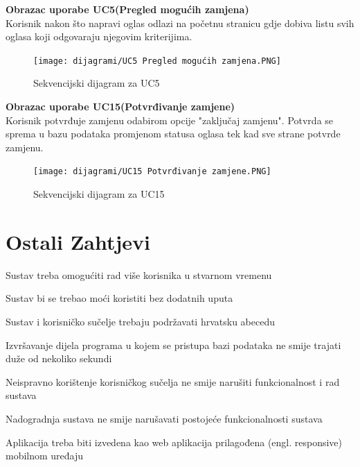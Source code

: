 \noindent \textbf{Obrazac uporabe UC5(Pregled mogućih zamjena)}\\
\indent Korisnik nakon što napravi oglas odlazi na početnu stranicu gdje dobiva listu svih oglasa koji odgovaraju njegovim kriterijima.


\begin{figure}[H]
	\texttt{[image: dijagrami/UC5 Pregled mogućih zamjena.PNG]} %
	\centering
	\caption{Sekvencijski dijagram za UC5}
	\label{fig:sekdijag3}
\end{figure}

\noindent \textbf{Obrazac uporabe UC15(Potvrđivanje zamjene)}\\
\indent Korisnik potvrđuje zamjenu odabirom opcije "zaključaj zamjenu". Potvrda se sprema u bazu podataka promjenom statusa oglasa tek kad sve strane potvrde zamjenu.


\begin{figure}[H]
	\texttt{[image: dijagrami/UC15 Potvrđivanje zamjene.PNG]} %
	\centering
	\caption{Sekvencijski dijagram za UC15}
	\label{fig:sekdijag4}
\end{figure}

\section{Ostali Zahtjevi}
\begin{packed_enum}
	\item Sustav treba omogućiti rad više korisnika u stvarnom vremenu
	\item Sustav bi se trebao moći koristiti bez dodatnih uputa
	\item Sustav i korisničko sučelje trebaju podržavati hrvatsku abecedu
	\item Izvršavanje dijela programa u kojem se pristupa bazi podataka ne smije trajati duže od nekoliko sekundi
	\item Neispravno korištenje korisničkog sučelja ne smije narušiti funkcionalnost i rad sustava
	\item Nadogradnja sustava ne smije narušavati postojeće funkcionalnosti sustava
	\item Aplikacija treba biti izvedena kao web aplikacija prilagođena (engl. responsive) mobilnom uređaju
\end{packed_enum}






